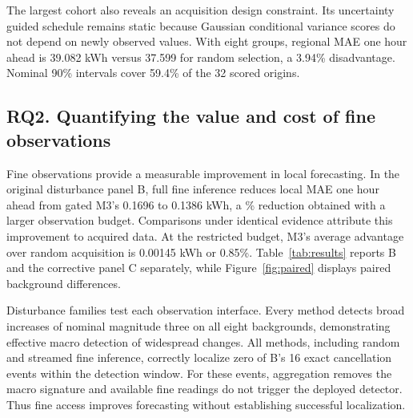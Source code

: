\documentclass[conference]{IEEEtran}
\begin{document}
The largest cohort also reveals an acquisition design constraint. Its uncertainty guided schedule remains static because Gaussian conditional variance scores do not depend on newly observed values. With eight groups, regional MAE one hour ahead is 39.082 kWh versus 37.599 for random selection, a 3.94\% disadvantage. Nominal 90\% intervals cover 59.4\% of the 32 scored origins.





\begin{table}[!t]
\caption{Fine observations improve forecasts without establishing an acquisition advantage. Results use recorded episode artifacts. B is the original disturbance panel and C the corrective panel. Local MAE one hour ahead is in kWh per affected household, using 80 local episodes in B and 12 in C. Original detection and correct group localization use lags 0--5 for B's 96 demand episodes and lags 0--6 for C's 12. Control alarms use unmodified episodes. Delay includes misses at 3.5 h. Representations receiving identical evidence match their source policy and are omitted as duplicate rows.}
\label{tab:results}\centering

\end{table}

\subsection{RQ2. Quantifying the value and cost of fine observations}
Fine observations provide a measurable improvement in local forecasting. In the original disturbance panel B, full fine inference reduces local MAE one hour ahead from gated M3's 0.1696 to 0.1386 kWh, a \FineGainPercent{}\% reduction obtained with a larger observation budget. Comparisons under identical evidence attribute this improvement to acquired data. At the restricted budget, M3's average advantage over random acquisition is 0.00145 kWh or 0.85\%. Table~\ref{tab:results} reports B and the corrective panel C separately, while Figure~\ref{fig:paired} displays paired background differences.

Disturbance families test each observation interface. Every method detects broad increases of nominal magnitude three on all eight backgrounds, demonstrating effective macro detection of widespread changes. All methods, including random and streamed fine inference, correctly localize zero of B's 16 exact cancellation events within the detection window. For these events, aggregation removes the macro signature and available fine readings do not trigger the deployed detector. Thus fine access improves forecasting without establishing successful localization.
\end{document}
